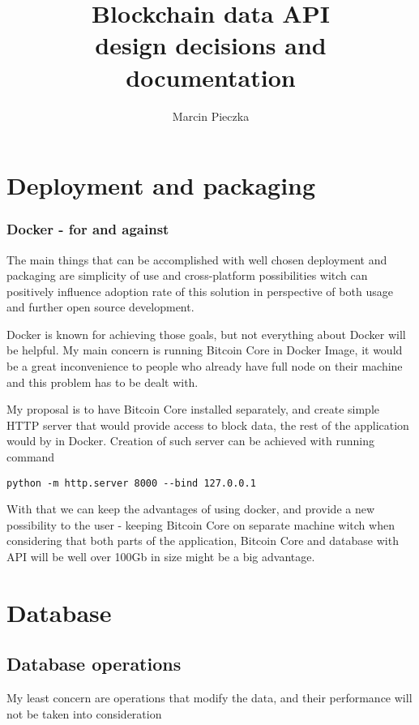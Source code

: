 \documentclass{article}
\begin{document}
\title{
	Blockchain data API \\
	\large design decisions and documentation
}
\date{}
\author{Marcin Pieczka}
\maketitle

\section{Deployment and packaging}
\subsubsection*{Docker - for and against}

The main things that can be accomplished with well chosen deployment and packaging are simplicity of use and cross-platform possibilities witch can positively influence adoption rate of this solution in perspective of both usage and further open source development.

Docker is known for achieving those goals, but not everything about Docker will be helpful. My main concern is running Bitcoin Core in Docker Image, it would be a great inconvenience to people who already have full node on their machine and this problem has to be dealt with.

My proposal is to have Bitcoin Core installed separately, and create simple HTTP server that would provide access to block data, the rest of the application would by in Docker. Creation of such server can be achieved with running command  
\begin{verbatim}
python -m http.server 8000 --bind 127.0.0.1
\end{verbatim}
With that we can keep the advantages of using docker, and provide a new possibility to the user - keeping Bitcoin Core on separate machine witch when considering that both parts of the application, Bitcoin Core and database with API will be well over 100Gb in size might be a big advantage.

\section{Database}
\subsection*{Database operations}
My least concern are operations that modify the data, and their performance will not be taken into consideration
\end{document}
